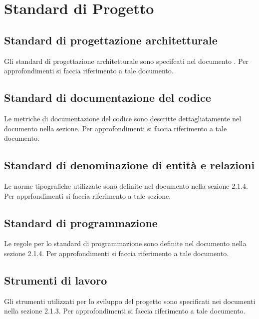 \section{Standard di Progetto}
\label{sec:standardProgetto}

\subsection{Standard di progettazione architetturale}
\label{sub:Standard di progettazione architetturale}

Gli standard di progettazione architetturale sono specifcati nel documento \STdoc. Per approfondimenti si faccia riferimento a tale documento.

\subsection{Standard di documentazione del codice}

Le metriche di documentazione del codice sono descritte dettagliatamente nel documento \PQdoc nella sezione. Per approfondimenti si faccia riferimento a tale documento.

\subsection{Standard di denominazione di entità e relazioni}

Le norme tipografiche utilizzate sono definite nel documento \NPdoc nella sezione 2.1.4. Per apprfondimenti si faccia riferimento a tale sezione.

\subsection{Standard di programmazione}
\label{sub:Standard di programmazione}

Le regole per lo standard di programmazione sono definite nel documento \NPdoc nella sezione 2.1.4. Per approfondimenti si faccia riferimento a tale documento.

\subsection{Strumenti di lavoro}
\label{sub:Strumenti di lavoro}

Gli strumenti utilizzati per lo sviluppo del progetto sono specificati nei documenti \NPdoc nella sezione 2.1.3. Per approfondimenti si faccia riferimento a tale documento.
